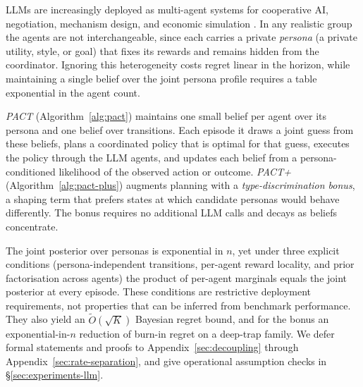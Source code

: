 \documentclass{article}
\def\textsuperscript#1{#1}%
\begin{document}
LLMs are increasingly deployed as multi-agent systems for cooperative AI, negotiation, mechanism design, and economic simulation \citep{zhang2021multi,leibo2017multi,perolat2017multi}. In any realistic group the agents are not interchangeable, since each carries a private \emph{persona} (a private utility, style, or goal) that fixes its rewards and remains hidden from the coordinator. Ignoring this heterogeneity costs regret linear in the horizon, while maintaining a single belief over the joint persona profile requires a table exponential in the agent count.

\emph{PACT} (Algorithm~\ref{alg:pact}) maintains one small belief per agent over its persona and one belief over transitions. Each episode it draws a joint guess from these beliefs, plans a coordinated policy that is optimal for that guess, executes the policy through the LLM agents, and updates each belief from a persona-conditioned likelihood of the observed action or outcome. \emph{PACT\textsuperscript{+}} (Algorithm~\ref{alg:pact-plus}) augments planning with a \emph{type-discrimination bonus}, a shaping term that prefers states at which candidate personas would behave differently. The bonus requires no additional LLM calls and decays as beliefs concentrate.

The joint posterior over personas is exponential in $n$, yet under three explicit conditions (persona-independent transitions, per-agent reward locality, and prior factorisation across agents) the product of per-agent marginals equals the joint posterior at every episode. These conditions are restrictive deployment requirements, not properties that can be inferred from benchmark performance. They also yield an $\tilde O(\sqrt K)$ Bayesian regret bound, and for the bonus an exponential-in-$n$ reduction of burn-in regret on a deep-trap family. We defer formal statements and proofs to Appendix~\ref{sec:decoupling} through Appendix~\ref{sec:rate-separation}, and give operational assumption checks in \S\ref{sec:experiments-llm}.
\end{document}
